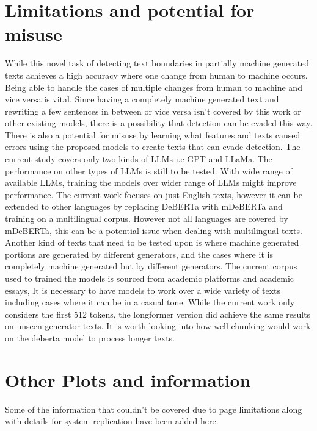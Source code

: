 \documentclass[11pt]{article}
\begin{document}
\section{Limitations and potential for misuse}
While this novel task of detecting text boundaries in partially machine generated texts achieves a high accuracy where one change from human to machine occurs. Being able to handle the cases of multiple changes from human to machine and vice versa is vital. Since having a completely machine generated text and rewriting a few sentences in between or vice versa isn't covered by this work or other existing models, there is a possibility that detection can be evaded this way. There is also a potential for misuse by learning what features and texts caused errors using the proposed models to create texts that can evade detection. The current study covers only two kinds of LLMs i.e GPT and LLaMa. The performance on other types of LLMs is still to be tested. With wide range of available LLMs, training the models over wider range of LLMs might improve performance. The current work focuses on just English texts, however it can be extended to other languages by replacing DeBERTa with mDeBERTa and training on a multilingual corpus. However not all languages are covered by mDeBERTa, this can be a potential issue when dealing with multilingual texts. Another kind of texts that need to be tested upon is where machine generated portions are generated by different generators, and the cases where it is completely machine generated but by different generators. The current corpus used to trained the models is sourced from academic platforms and academic essays, It is necessary to have models to work over a wide variety of texts including cases where it can be in a casual tone. While the current work only considers the first 512 tokens, the longformer version did achieve the same results on unseen generator texts. It is worth looking into how well chunking would work on the deberta model to process longer texts.
%


\appendix
\section{Other Plots and information}
\label{sec:appendix}
Some of the information that couldn't be covered due to page limitations along with details for system replication have been added here.
\end{document}

